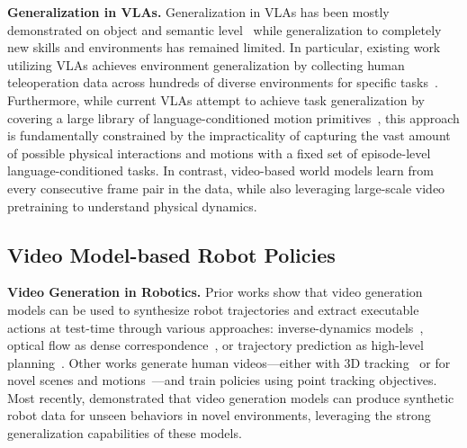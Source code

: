 \documentclass[10pt,logo,copyright]{nvidiatechreport}
\begin{document}
\textbf{Generalization in VLAs.} Generalization in VLAs has been mostly demonstrated on object and semantic level~\citep{rt22023arxiv, gao2025taxonomy} while generalization to completely new skills and environments has remained limited. In particular, existing work utilizing VLAs achieves environment generalization by collecting human teleoperation data across hundreds of diverse environments for specific tasks~\citep{intelligence2025pi}. Furthermore, while current VLAs attempt to achieve task generalization by covering a large library of language-conditioned motion primitives~\citep{team2025gemini}, this approach is fundamentally constrained by the impracticality of capturing the vast amount of possible physical interactions and motions with a fixed set of episode-level language-conditioned tasks. In contrast, video-based world models learn from every consecutive frame pair in the data, while also leveraging large-scale video pretraining to understand physical dynamics.

\subsection{Video Model-based Robot Policies}
\textbf{Video Generation in Robotics.} Prior works show that video generation models can be used to synthesize robot trajectories and extract executable actions at test-time through various approaches: inverse-dynamics models~\citep{du2023learning, zhou2024robodreamer}, optical flow as dense correspondence~\citep{ko2024learning}, or trajectory prediction as high-level planning~\citep{yang2024learning, du2024video}. Other works generate human videos—either with 3D tracking~\citep{liang2024dreamitate} or for novel scenes and motions~\citep{bharadhwaj2024gen2act, chen2025large}—and train policies using point tracking objectives. Most recently, \citep{jang2025dreamgen, luo2025solving} demonstrated that video generation models can produce synthetic robot data for unseen behaviors in novel environments, leveraging the strong generalization capabilities of these models.
\end{document}
